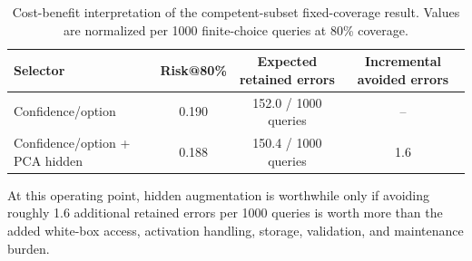 
\begin{table}[t]
\centering
\small
\caption{Cost-benefit interpretation of the competent-subset fixed-coverage result. Values are normalized per 1000 finite-choice queries at 80\% coverage.}
\label{tab:cost-benefit}
\begin{threeparttable}
\begin{tabular}{lccc}
\toprule
Selector & Risk@80\% & Expected retained errors & Incremental avoided errors \\
\midrule
Confidence/option & 0.190 & 152.0 / 1000 queries & -- \\
Confidence/option + PCA hidden & 0.188 & 150.4 / 1000 queries & 1.6 \\
\bottomrule
\end{tabular}
\begin{tablenotes}[flushleft]\footnotesize\item At this operating point, hidden augmentation is worthwhile only if avoiding roughly 1.6 additional retained errors per 1000 queries is worth more than the added white-box access, activation handling, storage, validation, and maintenance burden.\end{tablenotes}
\end{threeparttable}
\end{table}

